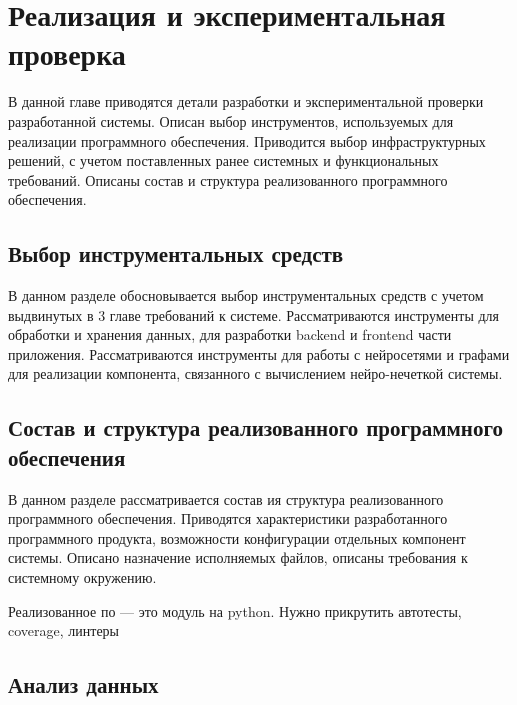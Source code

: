 \chapter{Реализация и экспериментальная проверка}

\begin{annotation}
	В данной главе приводятся детали разработки и экспериментальной проверки
	разработанной системы. Описан выбор инструментов, используемых для реализации
	программного обеспечения. Приводится выбор инфраструктурных решений,
	с учетом поставленных ранее системных и функциональных требований.
	Описаны состав и структура реализованного программного обеспечения.
\end{annotation}




\section{Выбор инструментальных средств}
\begin{annotation}
	В данном разделе обосновывается выбор инструментальных средств с учетом выдвинутых в 3
	главе требований к системе. Рассматриваются инструменты для обработки и хранения данных,
	для разработки backend и frontend части приложения. Рассматриваются инструменты для работы
	с нейросетями и графами для реализации компонента, связанного с вычислением нейро-нечеткой системы.
\end{annotation}



\section{Состав и структура реализованного программного обеспечения}
\begin{annotation}
	В данном разделе рассматривается состав ия структура реализованного программного обеспечения.
	Приводятся характеристики разработанного программного продукта, возможности конфигурации отдельных
	компонент системы. Описано назначение исполняемых файлов, описаны требования к системному окружению.
\end{annotation}

Реализованное по --- это модуль на python.
Нужно прикрутить автотесты, coverage, линтеры

\section{Анализ данных}

